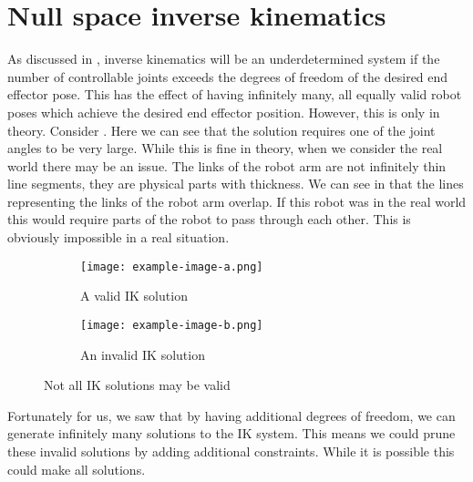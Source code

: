 \appendix
\chapter{Null space inverse kinematics}
\label{apx:null-space}
As discussed in , inverse kinematics will be an underdetermined system if the number of controllable joints exceeds the degrees of freedom of the desired end effector pose. This has the effect of having infinitely many, all equally valid robot poses which achieve the desired end effector position. However, this is only in theory. Consider . Here we can see that the solution requires one of the joint angles to be very large. While this is fine in theory, when we consider the real world there may be an issue. The links of the robot arm are not infinitely thin line segments, they are physical parts with thickness. We can see in  that the lines representing the links of the robot arm overlap. If this robot was in the real world this would require parts of the robot to pass through each other. This is obviously impossible in a real situation.

\begin{figure}[h]
    \centering
    \begin{subfigure}[b]{0.45\textwidth}
        \texttt{[image: example-image-a.png]}
        \caption{A valid IK solution}
        \label{fig:ik-valid}
    \end{subfigure}
    \hfill
    \begin{subfigure}[b]{0.45\textwidth}
        \texttt{[image: example-image-b.png]}
        \caption{An invalid IK solution}
        \label{fig:ik-invalid}
    \end{subfigure}
    \caption{Not all IK solutions may be valid}
    \label{fig:ik-null-space}
\end{figure}

Fortunately for us, we saw that by having additional degrees of freedom, we can generate infinitely many solutions to the IK system. This means we could prune these invalid solutions by adding additional constraints. While it is possible this could make all solutions.